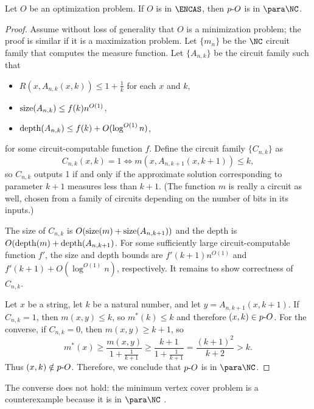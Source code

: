 \begin{theorem}\label{thm:encasfpp}
  Let $O$ be an optimization problem.
  If $O$ is in $\ENCAS$, then $p\textnormal{-}{O}$ is in $\para \NC$.
\end{theorem}
\begin{proof}
  Assume without loss of generality that $O$ is a minimization problem; the proof is similar if it is a maximization problem.
  Let $\{m_n\}$ be the $\NC$ circuit family that computes the measure function.
  Let $\{A_{n, k}\}$ be the circuit family such that
  \begin{itemize}
  \item $R(x, A_{n, k}(x, k)) \leq 1 + \frac{1}{k}$ for each $x$ and $k$,
  \item $\operatorname{size}(A_{n, k}) \leq f(k) n^{O(1)}$,
  \item $\operatorname{depth}(A_{n, k}) \leq f(k) + O(\log^{O(1)} n)$,
  \end{itemize}
  for some circuit-computable function $f$.
  Define the circuit family $\{C_{n, k}\}$ as
  \[
  C_{n, k}(x, k) = 1 \iff m(x, A_{n, k + 1}(x, k + 1)) \leq k,
  \]
  so $C_{n, k}$ outputs 1 if and only if the approximate solution corresponding to parameter $k + 1$ measures less than $k + 1$.
  (The function $m$ is really a circuit as well, chosen from a family of circuits depending on the number of bits in its inputs.)

  The size of $C_{n, k}$ is $O(\operatorname{size}(m) + \operatorname{size}(A_{n, k + 1}))$ and the depth is $O(\operatorname{depth}(m) + \operatorname{depth}(A_{n, k + 1})$.
  For some sufficiently large circuit-computable function $f'$, the size and depth bounds are $f'(k + 1) n^{O(1)}$ and $f'(k + 1) + O(\log^{O(1)} n)$, respectively.
  It remains to show correctness of $C_{n, k}$.

  Let $x$ be a string, let $k$ be a natural number, and let $y = A_{n, k + 1}(x, k + 1)$.
  If $C_{n, k} = 1$, then $m(x, y) \leq k$, so $m^*(k) \leq k$ and therefore $(x, k) \in p \textnormal{-} O$.
  For the converse, if $C_{n, k} = 0$, then $m(x, y) \geq k + 1$, so
  \[
  m^*(x) \geq \frac{m(x, y)}{1 + \frac{1}{k + 1}} \geq \frac{k + 1}{1 + \frac{1}{k + 1}} = \frac{(k + 1)^2}{k + 2} > k.
  \]
  Thus $(x, k) \notin p \textnormal{-} O$.
  Therefore, we conclude that $p \textnormal{-} O$ is in $\para \NC$.
\end{proof}

The converse does not hold: the minimum vertex cover problem is a counterexample because it is in $\para \NC$ \autocite[Theorem~4.5]{bst15}.

